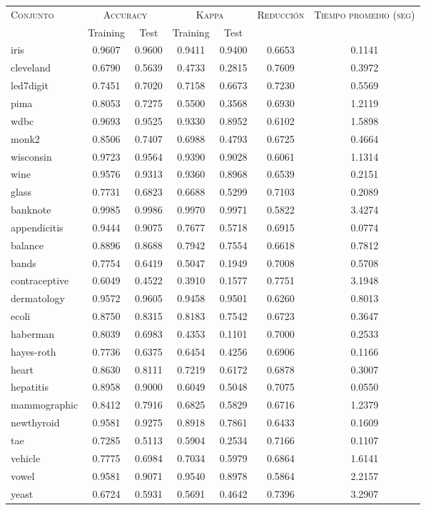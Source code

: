 \begin{table}[]
\centering
\begin{tabular}{l c c c c c c}
\hline
\multirow{2}{*}{\textsc{Conjunto}}
	& \multicolumn{2}{c}{\textsc{Accuracy}}
	& \multicolumn{2}{c}{\textsc{Kappa}}
	& \textsc{Reducción}
	& \textsc{Tiempo promedio (seg)} \\
	& Training & Test
	& Training & Test \\ 
\hline
\hline

iris & 0.9607 & 0.9600 & 0.9411 & 0.9400 & 0.6653 & 0.1141 \\
cleveland & 0.6790 & 0.5639 & 0.4733 & 0.2815 & 0.7609 & 0.3972 \\
led7digit & 0.7451 & 0.7020 & 0.7158 & 0.6673 & 0.7230 & 0.5569 \\
pima & 0.8053 & 0.7275 & 0.5500 & 0.3568 & 0.6930 & 1.2119 \\
wdbc & 0.9693 & 0.9525 & 0.9330 & 0.8952 & 0.6102 & 1.5898 \\
monk2 & 0.8506 & 0.7407 & 0.6988 & 0.4793 & 0.6725 & 0.4664 \\
wisconsin & 0.9723 & 0.9564 & 0.9390 & 0.9028 & 0.6061 & 1.1314 \\
wine & 0.9576 & 0.9313 & 0.9360 & 0.8968 & 0.6539 & 0.2151 \\
glass & 0.7731 & 0.6823 & 0.6688 & 0.5299 & 0.7103 & 0.2089 \\
banknote & 0.9985 & 0.9986 & 0.9970 & 0.9971 & 0.5822 & 3.4274 \\
appendicitis & 0.9444 & 0.9075 & 0.7677 & 0.5718 & 0.6915 & 0.0774 \\
balance & 0.8896 & 0.8688 & 0.7942 & 0.7554 & 0.6618 & 0.7812 \\
bands & 0.7754 & 0.6419 & 0.5047 & 0.1949 & 0.7008 & 0.5708 \\
contraceptive & 0.6049 & 0.4522 & 0.3910 & 0.1577 & 0.7751 & 3.1948 \\
dermatology & 0.9572 & 0.9605 & 0.9458 & 0.9501 & 0.6260 & 0.8013 \\
ecoli & 0.8750 & 0.8315 & 0.8183 & 0.7542 & 0.6723 & 0.3647 \\
haberman & 0.8039 & 0.6983 & 0.4353 & 0.1101 & 0.7000 & 0.2533 \\
hayes-roth & 0.7736 & 0.6375 & 0.6454 & 0.4256 & 0.6906 & 0.1166 \\
heart & 0.8630 & 0.8111 & 0.7219 & 0.6172 & 0.6878 & 0.3007 \\
hepatitis & 0.8958 & 0.9000 & 0.6049 & 0.5048 & 0.7075 & 0.0550 \\
mammographic & 0.8412 & 0.7916 & 0.6825 & 0.5829 & 0.6716 & 1.2379 \\
newthyroid & 0.9581 & 0.9275 & 0.8918 & 0.7861 & 0.6433 & 0.1609 \\
tae & 0.7285 & 0.5113 & 0.5904 & 0.2534 & 0.7166 & 0.1107 \\
vehicle & 0.7775 & 0.6984 & 0.7034 & 0.5979 & 0.6864 & 1.6141 \\
vowel & 0.9581 & 0.9071 & 0.9540 & 0.8978 & 0.5864 & 2.2157 \\
yeast & 0.6724 & 0.5931 & 0.5691 & 0.4642 & 0.7396 & 3.2907 \\


\end{tabular}
\end{table}
